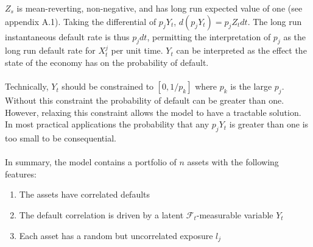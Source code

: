 \documentclass[12pt]{article}
\theoremstyle{definition}
\begin{document}
\(Z_s\) is mean-reverting, non-negative, and has long run expected value of one (see appendix A.1).  Taking the differential of \(p_j Y_t\), \(d(p_j Y_t)=p_j Z_t dt\).  The long run instantaneous default rate is thus \(p_j dt\), permitting the interpretation of \(p_j\) as the long run default rate for \(X_t ^ j\) per unit time. \(Y_t\) can be interpreted as the effect the state of the economy has on the probability of default.
\\
\\
Technically, \(Y_t\) should be constrained to \([0, 1/p_k]\) where \(p_k\) is the large \(p_j\).  Without this constraint the probability of default can be greater than one.  However, relaxing this constraint allows the model to have a tractable solution.  In most practical applications the probability that any \(p_j Y_t\) is greater than one is too small to be consequential.  
\\
\\
In summary, the model contains a portfolio of \(n\) assets with the following features:
\begin{enumerate}
\item The assets have correlated defaults
\item The default correlation is driven by a latent \(\mathcal{F}_t\)-measurable variable \(Y_t\)
\item Each asset has a random but uncorrelated exposure \(l_j\)
\end{enumerate}
\end{document}
